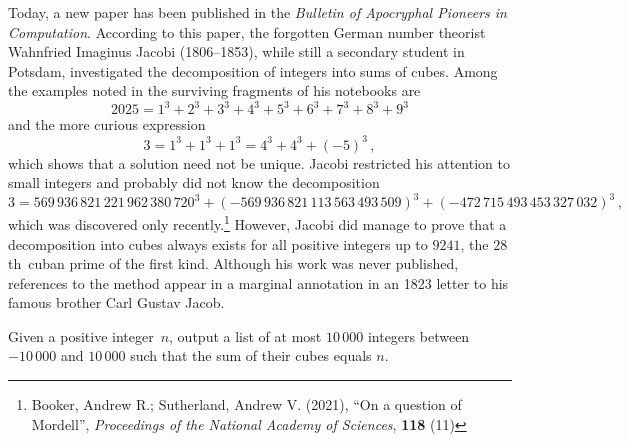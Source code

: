 






Today, a new paper has been published
in the \emph{Bulletin of Apocryphal Pioneers in Computation}.
According to this paper, the forgotten German number theorist Wahnfried Imaginus Jacobi (1806--1853), while still a secondary student in Potsdam, investigated the decomposition of integers into sums of cubes.
Among the examples noted in the surviving fragments of his notebooks are \[
    2025 = 1^3 + 2^3 + 3^3 + 4^3 + 5^3 + 6^3 + 7^3 + 8^3 + 9^3
\] and the more curious expression \[ 3 = 1^3 + 1^3 + 1^3 = 4^3 + 4^3 + (-5)^3\,,\]
which shows that a solution need not be unique.
Jacobi restricted his attention to small integers and probably did not know the decomposition {\small \[
    3 = 569\,936\,821\,221\,962\,380\,720^3 + (-569\,936\,821\,113\,563\,493\,509)^3 + (-472\,715\,493\,453\,327\,032)^3
\,,\]}%
which was discovered only recently.\footnote{Booker, Andrew R.; Sutherland, Andrew V. (2021), ``On a question of Mordell'', \emph{Proceedings of the National Academy of Sciences}, \textbf{118} (11)}
However, Jacobi did manage to prove that a decomposition into cubes always exists for all positive integers up to $9241$, the $28$th~cuban prime of the first kind.
Although his work was never published, references to the method appear in a marginal annotation in an 1823 letter to his famous brother Carl Gustav Jacob.

\medskip
Given a positive integer~$n$, output a list of at most $10\,000$ integers between $-10\,000$ and $10\,000$
such that the sum of their cubes equals $n$.

